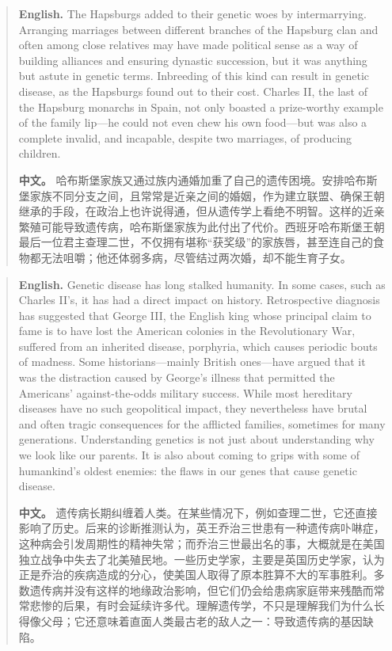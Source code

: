 \begin{quote}
\noindent\textbf{English.} The Hapsburgs added to their genetic woes by intermarrying. Arranging marriages between different branches of the Hapsburg clan and often among close relatives may have made political sense as a way of building alliances and ensuring dynastic succession, but it was anything but astute in genetic terms. Inbreeding of this kind can result in genetic disease, as the Hapsburgs found out to their cost. Charles II, the last of the Hapsburg monarchs in Spain, not only boasted a prize-worthy example of the family lip---he could not even chew his own food---but was also a complete invalid, and incapable, despite two marriages, of producing children.

\smallskip
\noindent\textbf{中文。} 哈布斯堡家族又通过族内通婚加重了自己的遗传困境。安排哈布斯堡家族不同分支之间，且常常是近亲之间的婚姻，作为建立联盟、确保王朝继承的手段，在政治上也许说得通，但从遗传学上看绝不明智。这样的近亲繁殖可能导致遗传病，哈布斯堡家族为此付出了代价。西班牙哈布斯堡王朝最后一位君主查理二世，不仅拥有堪称“获奖级”的家族唇，甚至连自己的食物都无法咀嚼；他还体弱多病，尽管结过两次婚，却不能生育子女。
\end{quote}

\begin{quote}
\noindent\textbf{English.} Genetic disease has long stalked humanity. In some cases, such as Charles II's, it has had a direct impact on history. Retrospective diagnosis has suggested that George III, the English king whose principal claim to fame is to have lost the American colonies in the Revolutionary War, suffered from an inherited disease, porphyria, which causes periodic bouts of madness. Some historians---mainly British ones---have argued that it was the distraction caused by George's illness that permitted the Americans' against-the-odds military success. While most hereditary diseases have no such geopolitical impact, they nevertheless have brutal and often tragic consequences for the afflicted families, sometimes for many generations. Understanding genetics is not just about understanding why we look like our parents. It is also about coming to grips with some of humankind's oldest enemies: the flaws in our genes that cause genetic disease.

\smallskip
\noindent\textbf{中文。} 遗传病长期纠缠着人类。在某些情况下，例如查理二世，它还直接影响了历史。后来的诊断推测认为，英王乔治三世患有一种遗传病卟啉症，这种病会引发周期性的精神失常；而乔治三世最出名的事，大概就是在美国独立战争中失去了北美殖民地。一些历史学家，主要是英国历史学家，认为正是乔治的疾病造成的分心，使美国人取得了原本胜算不大的军事胜利。多数遗传病并没有这样的地缘政治影响，但它们仍会给患病家庭带来残酷而常常悲惨的后果，有时会延续许多代。理解遗传学，不只是理解我们为什么长得像父母；它还意味着直面人类最古老的敌人之一：导致遗传病的基因缺陷。
\end{quote}

